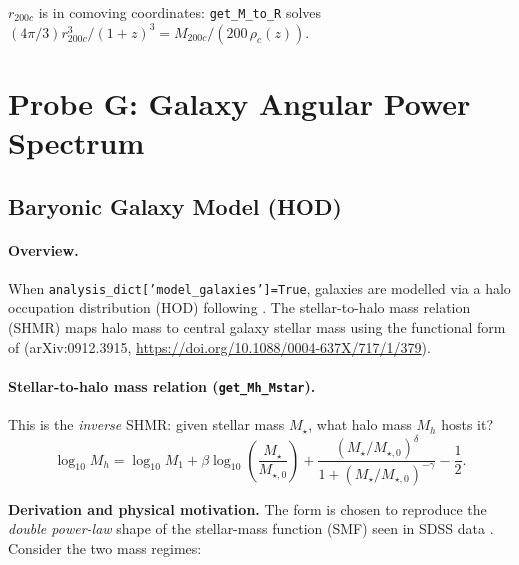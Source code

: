 \documentclass[12pt,a4paper]{article}
\newcommand{\code}[1]{\texttt{\small #1}}
\newcommand{\param}[1]{\texttt{\small #1}}
\begin{document}
$r_{200c}$ is in comoving coordinates: \code{get\_M\_to\_R} solves
$(4\pi/3)r_{200c}^3/(1+z)^3 = M_{200c}/(200\,\rho_c(z))$.

\section{Probe G: Galaxy Angular Power Spectrum}
\label{sec:probeG}

\subsection{Baryonic Galaxy Model (HOD)}
\label{sec:hod}

\paragraph{Overview.}
When \param{analysis\_dict['model\_galaxies']=True}, galaxies are modelled via a
halo occupation distribution (HOD) following \cite{Leauthaud2011}. The
stellar-to-halo mass relation (SHMR) maps halo mass to central galaxy stellar
mass using the functional form of \cite{Behroozi2010}
(arXiv:0912.3915, \url{https://doi.org/10.1088/0004-637X/717/1/379}).

\paragraph{Stellar-to-halo mass relation (\code{get\_Mh\_Mstar}).}
\label{par:shmr}

This is the \emph{inverse} SHMR: given stellar mass $M_\star$, what halo mass
$M_h$ hosts it?
\begin{equation}
  \label{eq:shmr}
  \log_{10}M_h = \log_{10}M_1
  + \beta\log_{10}\!\left(\frac{M_\star}{M_{\star,0}}\right)
  + \frac{(M_\star/M_{\star,0})^\delta}{1+(M_\star/M_{\star,0})^{-\gamma}} - \frac{1}{2}.
\end{equation}

\textbf{Derivation and physical motivation.}
The form is chosen to reproduce the \emph{double power-law} shape of the
stellar-mass function (SMF) seen in SDSS data \citep{Behroozi2010}.
Consider the two mass regimes:
\end{document}
